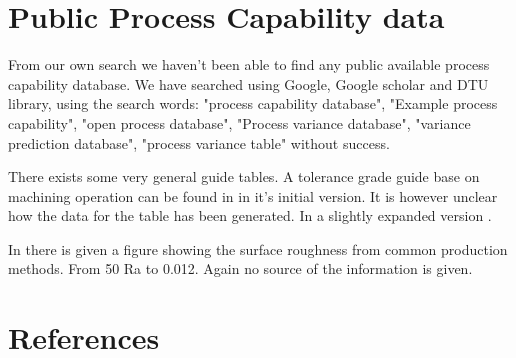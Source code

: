 \documentclass[aip,amsmath,reprint, author-year]{revtex4-1}
\begin{document}
\section{Public Process Capability data}
From our own search we haven't been able to find any public available process capability database. We have searched using Google, Google scholar and DTU library, using the search words: "process capability database", "Example process capability", "open process database", "Process variance database", "variance prediction database", "process variance table" without success. 

There exists some very general guide tables. A tolerance grade guide base on machining operation can be found in \citet{united1967preferred} in it's initial version. It is however unclear how the data for the table has been generated. In a slightly expanded version \citet{american1978preferred}.

In \citet[p. 715]{oberg2008machinery} there is given a figure showing the surface roughness from common production methods. From 50 Ra to 0.012. Again no source of the information is given.

\section*{References}

\end{document}
